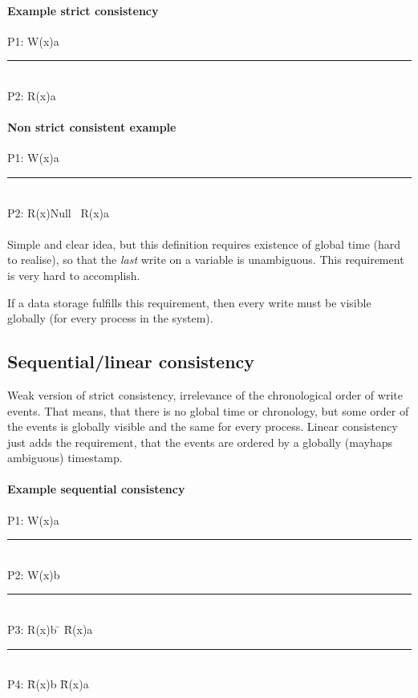 \paragraph{Example strict consistency}
\begin{tabbing}
P1: W(x)a \= \\
\rule{0.3\textwidth}{0.4pt} \\
P2: \> R(x)a
\end{tabbing}
\paragraph{Non strict consistent example}
\begin{tabbing}
P1: W(x)a \= \\
\rule{0.3\textwidth}{0.4pt} \\
P2: \> R(x)Null \ R(x)a
\end{tabbing}

\paragraph{}
Simple and clear idea, but this definition requires existence of global time (hard to realise), so that the \emph{last} write on a variable is unambiguous. This requirement is very hard to accomplish.

If a data storage fulfills this requirement, then every write must be visible globally (for every process in the system).

\subsection{Sequential/linear consistency}
Weak version of strict consistency, irrelevance of the chronological order of write events.
That means, that there is no global time or chronology, but some order of the events is globally visible and the same for every process.
Linear consistency just adds the requirement, that the events are ordered by a globally (mayhaps ambiguous) timestamp.
\paragraph{Example sequential consistency}
\begin{tabbing}
P1: W(x)a \= \\
\rule{0.4\textwidth}{0.4pt} \\
P2: \> W(x)b \= \\
\rule{0.4\textwidth}{0.4pt} \\
P3: \> \> R(x)b \= \hspace{32pt} \= R(x)a \\
\rule{0.4\textwidth}{0.4pt} \\
P4: \> \> \> \= R(x)b \hspace{5pt} \= R(x)a \\
\end{tabbing}

